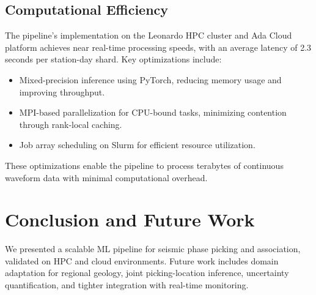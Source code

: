 \documentclass{llncs}
\begin{document}
\subsection{Computational Efficiency}
The pipeline's implementation on the Leonardo HPC cluster and Ada Cloud 
platform achieves near real-time processing speeds, with an average latency of 
2.3 seconds per station-day shard. Key optimizations include:
\begin{itemize}
  \item Mixed-precision inference using PyTorch, reducing memory usage and 
  improving throughput.
  \item MPI-based parallelization for CPU-bound tasks, minimizing contention through rank-local caching.
  \item Job array scheduling on Slurm for efficient resource utilization.
\end{itemize}
These optimizations enable the pipeline to process terabytes of continuous waveform data with minimal computational overhead.

\section{Conclusion and Future Work}
\label{sec:conclusion}
We presented a scalable ML pipeline for seismic phase picking and association, validated on HPC and cloud environments. Future work includes domain adaptation for regional geology, joint picking-location inference, uncertainty quantification, and tighter integration with real-time monitoring.
\end{document}
